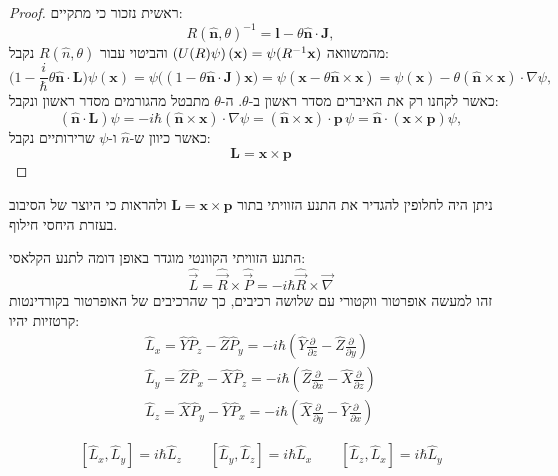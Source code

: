 \documentclass{tstextbook}
\begin{document}
\begin{proof}
ראשית נזכור כי מתקיים:
$$R({\hat{\mathbf{n}}},\theta)^{-1}=\mathbf{l}-\theta{\hat{\mathbf{n}}}\cdot\mathbf{J},$$
מהמשוואה \(\left(U(R)\psi\right)({\bf x})=\psi(R^{-1}{\bf x})\) והביטוי עבור \(R\left( \hat{n},\theta \right)\) נקבל:
$$\Big(1-{\frac{i}{\hbar}}\theta\mathbf{\hat{n}}\cdot\mathbf{L}\Big)\psi(\mathbf{x})=\psi\big((1-\theta\mathbf{\hat{n}}\cdot\mathbf{J})\mathbf{x}\big)=\psi(\mathbf{x}-\theta\mathbf{\hat{n}}\times\mathbf{x})=\psi(\mathbf{x})-\theta(\mathbf{\hat{n}}\times\mathbf{x})\cdot\nabla\psi,$$
כאשר לקחנו רק את האיברים מסדר ראשון ב-\(\theta\). ה-\(\theta\) מתבטל מהגורמים מסדר ראשון ונקבל:
$$({\hat{\mathbf{n}}}\cdot\mathbf{L})\psi=-i\hbar({\hat{\mathbf{n}}}{\times}\mathbf{x})\cdot\nabla\psi=({\hat{\mathbf{n}}}{\times}\mathbf{x})\cdot\mathbf{p}\,\psi={\hat{\mathbf{n}}}\cdot(\mathbf{x}{\times}\mathbf{p})\psi,$$
כאשר כיוון ש-\(\hat{n}\) ו-\(\psi\) שרירותיים נקבל:
$$\mathbf{L}=\mathbf{x}{\times}\mathbf{p}$$

\end{proof}
\begin{remark}
ניתן היה לחלופין להגדיר את התנע הזוויתי בתור \(\mathbf{L}=\mathbf{x}\times \mathbf{p}\) ולהראות כי היוצר של הסיבוב בעזרת היחסי חילוף.

\end{remark}
\begin{corollary}
התנע הזוויתי הקוונטי מוגדר באופן דומה לתנע הקלאסי:
$$\hat{\vec{L}}=\hat{\vec{R}}\times\hat{\vec{P}}=-i\hbar\hat{\vec{R}}\times\vec{\nabla}$$
זהו למעשה אופרטור ווקטורי עם שלושה רכיבים, כך שהרכיבים של האופרטור בקורדינטות קרטזיות יהיו:
$$\begin{gather}\hat{L}_{x}=\hat{Y}\hat{P}_{z}-\hat{Z}\hat{P}_{y}=-i\hbar\left(\hat{Y}\frac{\partial}{\partial z}-\hat{Z}\frac{\partial}{\partial y}\right)\\ \hat{L}_{y}=\hat{Z}\hat{P}_{x}-\hat{X}\hat{P}_{z}=-i\hbar\left(\hat{Z}\frac{\partial}{\partial x}-\hat{X}\frac{\partial}{\partial z}\right)\\\hat{L}_{z}=\hat{X}\hat{P}_{y}-\hat{Y}\hat{P}_{x}=-i\hbar\left(\hat{X}\frac{\partial}{\partial y}-\hat{Y}\frac{\partial}{\partial x}\right) 
\end{gather}$$

\end{corollary}
\begin{proposition}
$$[\hat{L}_{x},\hat{L}_{y}]=i\hbar\hat{L}_{z}\qquad[\hat{L}_{y},\hat{L}_{z}]=i\hbar\hat{L}_{x}\qquad[\hat{L}_{z},\hat{L}_{x}]=i\hbar\hat{L}_{y}$$

\end{proposition}
\end{document}
